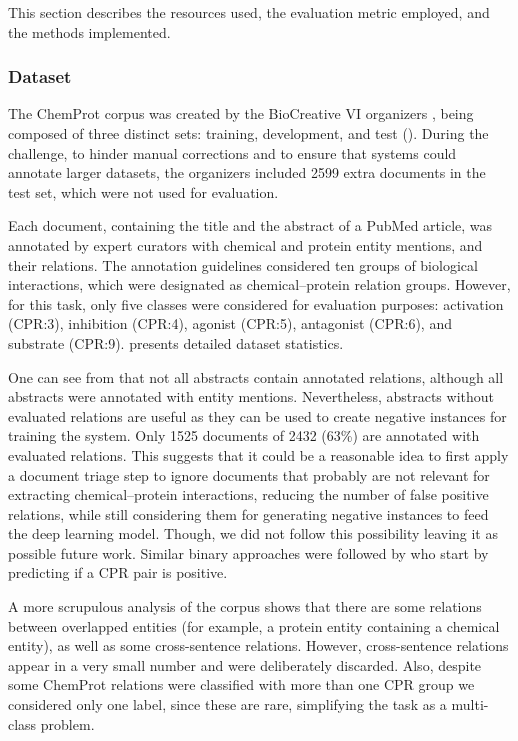 This section describes the resources used, the evaluation metric employed, and the methods implemented.


\subsubsection{Dataset}

The ChemProt corpus was created by the BioCreative VI organizers \parencite{krallinger2017a}, being composed of three distinct sets: training, development, and test ().
During the challenge, to hinder manual corrections and to ensure that systems could annotate larger datasets, the organizers included 2599 extra documents in the test set, which were not used for evaluation.

Each document, containing the title and the abstract of a PubMed article, was annotated by expert curators with chemical and protein entity mentions, and their relations.
The annotation guidelines considered ten groups of biological interactions, which were designated as chemical--protein relation groups.
However, for this task, only five classes were considered for evaluation purposes: activation (CPR:3), inhibition (CPR:4), agonist (CPR:5), antagonist (CPR:6), and substrate (CPR:9).
 presents detailed dataset statistics.



One can see from  that not all abstracts contain annotated relations, although all abstracts were annotated with entity mentions.
Nevertheless, abstracts without evaluated relations are useful as they can be used to create negative instances for training the system.
Only 1525 documents of 2432 (63\%) are annotated with evaluated relations.
This suggests that it could be a reasonable idea to first apply a document triage step to ignore documents that probably are not relevant for extracting chemical--protein interactions, reducing the number of false positive relations, while still considering them for generating negative instances to feed the deep learning model.
Though, we did not follow this possibility leaving it as possible future work.
Similar binary approaches were followed by \textcite{lung2017a,lung2019a,warikoo2018a} who start by predicting if a CPR pair is positive.

A more scrupulous analysis of the corpus shows that there are some relations between overlapped entities (for example, a protein entity containing a chemical entity), as well as some cross-sentence relations.
However, cross-sentence relations appear in a very small number and were deliberately discarded.
Also, despite some ChemProt relations were classified with more than one CPR group we considered only one label, since these are rare, simplifying the task as a multi-class problem.


